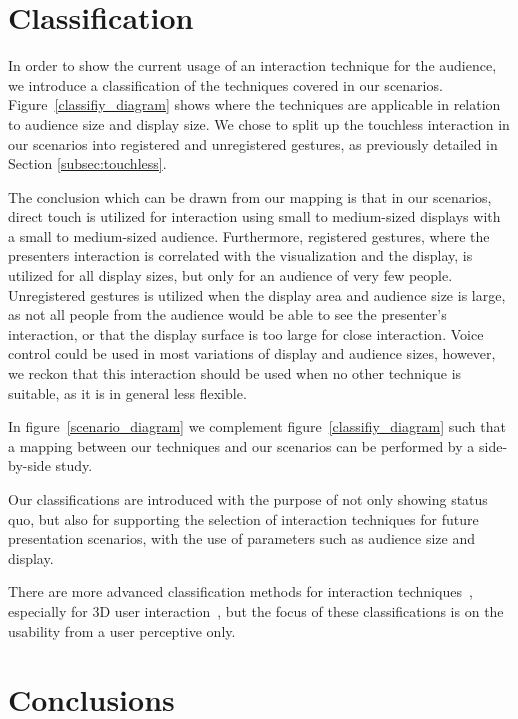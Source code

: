 \documentclass[review,journal]{vgtc}         %
\begin{document}
\section{Classification} \label{sec:classification}

In order to show the current usage of an interaction technique for the audience, we introduce a classification of the techniques covered in our scenarios.
Figure~\ref{classifiy_diagram} shows where the techniques are applicable in relation to audience size and display size. 
We chose to split up the touchless interaction in our scenarios into registered and unregistered gestures, as previously detailed in Section \ref{subsec:touchless}.

The conclusion which can be drawn from our mapping is that in our scenarios, direct touch is utilized for interaction using small to medium-sized displays with a small to medium-sized audience. 
Furthermore, registered gestures, where the presenters interaction is correlated with the visualization and the display, is utilized for all display sizes, but only for an audience of very few people.
Unregistered gestures is utilized when the display area and audience size is large, as not all people from the audience would be able to see the presenter's interaction, or that the display surface is too large for close interaction.
Voice control could be used in most variations of display and audience sizes, however, we reckon that this interaction should be used when no other technique is suitable, as it is in general less flexible. 

In figure~\ref{scenario_diagram} we complement figure~\ref{classifiy_diagram} such that a mapping between our techniques and our scenarios can 
be performed by a side-by-side study.

Our classifications are introduced with the purpose of not only showing status quo, but also for supporting the selection of interaction techniques for future presentation scenarios, with the use of parameters such as audience size and display.

There are more advanced classification methods for interaction techniques~\cite{stars:65-93:2012}, especially for 3D user interaction~\cite{978-3-319-07458-0_1, CGF:CGF194, Kettner95aclassification}, but the focus of these classifications is on the usability from a user perceptive only.

\section{Conclusions}\label{sec:conclusion}
\end{document}
